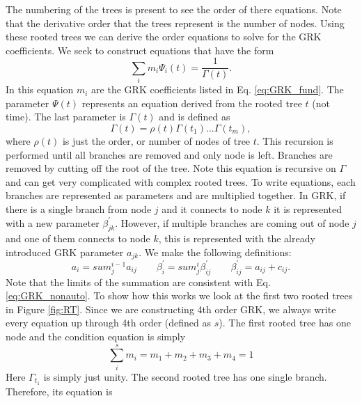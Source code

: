 \documentclass{ansconf}
\numberwithin{equation}{section}
\begin{document}
The numbering of the trees is present to see the order of there equations. Note that the derivative order that the trees represent is the number of nodes. Using these rooted trees we can derive the order equations to solve for the GRK coefficients. We seek to construct equations that have the form
\begin{equation} \label{eq:RT_psi}
    \sum_i m_i \Psi_i\left(t\right) = \frac{1}{\Gamma\left(t\right)}.
\end{equation}
In this equation $m_i$ are the GRK coefficients listed in Eq. \eqref{eq:GRK_fund}. The parameter $\Psi\left(t\right)$ represents an equation derived from the rooted tree $t$ (not time). The last parameter is $\Gamma\left(t\right)$ and is defined as
\begin{equation}
    \Gamma\left(t\right) = \rho\left(t\right)\Gamma\left(t_1\right) ... \Gamma\left(t_m\right),
\end{equation}
where $\rho\left(t\right)$ is just the order, or number of nodes of tree $t$. This recursion is performed until all branches are removed and only node is left. Branches are removed by cutting off the root of the tree. Note this equation is recursive on $\Gamma$ and can get very complicated with complex rooted trees. To write equations, each branches are represented as parameters and are multiplied together. In GRK, if there is a single branch from node $j$ and it connects to node $k$ it is represented with a new parameter $\beta^\prime_{jk}$. However, if multiple branches are coming out of node $j$ and one of them connects to node $k$, this is represented with the already introduced GRK parameter $a_{jk}$. We make the following definitions:
\begin{equation}\label{eq:RT_simp}
    a_{i} = sum_j^{i-1} a_{ij} \qquad \beta^\prime_i = sum_j^i \beta^\prime_{ij} \qquad \beta^\prime_{ij} = a_{ij} + c_{ij}.
\end{equation}
Note that the limits of the summation are consistent with Eq. \eqref{eq:GRK_nonauto}. To show how this works we look at the first two rooted trees in Figure \ref{fig:RT}. Since we are constructing 4th order GRK, we always write every equation up through 4th order (defined as $s$). The first rooted tree has one node and the condition equation is simply
\begin{equation} \label{eq:RT_t1}
    \sum_i^s m_i = m_1 + m_2 + m_3 + m_4 = 1
\end{equation}
Here $\Gamma_{t_1}$ is simply just unity. The second rooted tree has one single branch. Therefore, its equation is
\end{document}
